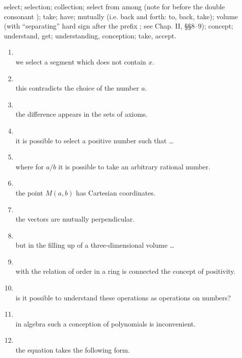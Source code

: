 \noindent{} select;  selection;  collection;  select from among (note  for  before the double consonant );  take;  have;  mutually (i.e. back and forth:  to,  back,  take);  volume (with ``separating'' hard sign after the prefix ; see Chap. II, §§8--9);  concept;  understand, get;  understanding, conception;  take, accept.

\begin{enumerate}[label=\arabic*)]
\item {}\\
      we select a segment which does not contain $x$.
\item {}\\
      this contradicts the choice of the number $a$.
\item {}\\
      the difference appears in the sets of axioms.
\item {}\\
      it is possible to select a positive number such that \ldots
\item {}\\
      where for $a/b$ it is possible to take an arbitrary rational number.
\item {}\\
      the point $M(a,b)$ has Cartesian coordinates.
\item {}\\
      the vectors are mutually perpendicular.
\item {}\\
      but in the filling up of a three-dimensional volume \ldots
\item {}\\
      with the relation of order in a ring is connected the concept of positivity.
\item {}\\
      is it possible to understand these operations as operations on numbers?
\item {}\\
      in algebra such a conception of polynomials is inconvenient.
\item {}\\
      the equation takes the following form.
\end{enumerate}

